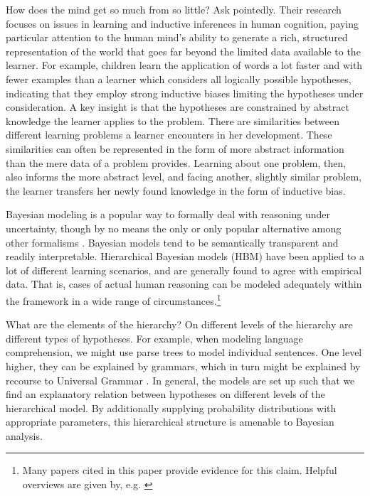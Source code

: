 \documentclass[11pt, a4paper]{article}
\begin{document}
How does the mind get so much from so little? Ask
\citet{tenenbaum11_how_to_grow_mind} pointedly. Their research focuses on issues
in learning and inductive inferences in human cognition, paying particular
attention to the human mind's ability to generate a rich, structured
representation of the world that goes far beyond the limited data available to
the learner. For example, children learn the application of words a lot faster
and with fewer examples than a learner which considers all logically possible
hypotheses, indicating that they employ strong inductive biases limiting the
hypotheses under consideration. A key insight is that the hypotheses are
constrained by abstract knowledge the learner applies to the problem. There are
similarities between different learning problems a learner encounters in her
development. These similarities can often be represented in the form of more
abstract information than the mere data of a problem provides. Learning about one
problem, then, also informs the more abstract level, and facing another,
slightly similar problem, the learner transfers her newly found knowledge in the
form of inductive bias.

Bayesian modeling is a popular way to formally deal with reasoning under
uncertainty, though by no means the only or only popular alternative among other
formalisms \citep{halpern03_reason_about_uncer}. Bayesian models tend to be
semantically transparent and readily interpretable. Hierarchical Bayesian models
(HBM) have been applied to a lot of different learning scenarios, and are
generally found to agree with empirical data. That is, cases of actual human
reasoning can be modeled adequately within the framework in a wide range of
circumstances.\footnote{Many papers cited in this paper provide evidence for this
  claim. Helpful overviews are given by, e.g.
  \citet{tenenbaum06_theor_based_bayes_model_induc_learn_reason,griffiths10_probab_model_cognit,tenenbaum11_how_to_grow_mind}}

What are the elements of the hierarchy? On different levels of the hierarchy are
different types of hypotheses. For example, when modeling language
comprehension, we might use parse trees to model individual sentences. One level
higher, they can be explained by grammars, which in turn might be explained by
recourse to Universal Grammar
\citep{kemp07_learn_overh_with_hierar_bayes_model}. In general, the models are
set up such that we find an explanatory relation between hypotheses on different
levels of the hierarchical model. By additionally supplying probability
distributions with appropriate parameters, this hierarchical structure is
amenable to Bayesian analysis.
\end{document}
